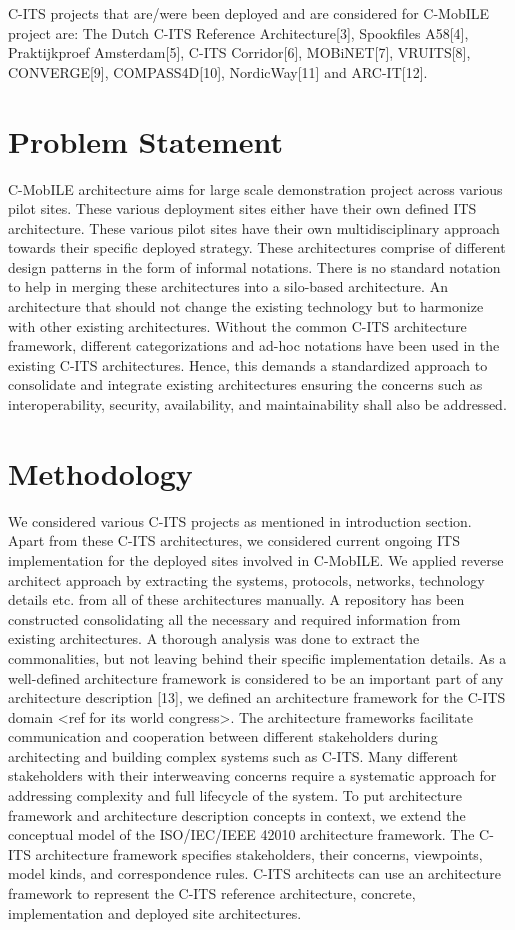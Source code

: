 \documentclass[conference]{IEEEtran}
\begin{document}
C-ITS projects that are/were been deployed and are considered for C-MobILE project are: The Dutch C-ITS Reference Architecture[3], Spookfiles A58[4], Praktijkproef Amsterdam[5], C-ITS Corridor[6], MOBiNET[7], VRUITS[8], CONVERGE[9], COMPASS4D[10], NordicWay[11] and ARC-IT[12].

\section{Problem Statement}

C-MobILE architecture aims for large scale demonstration project across various pilot sites. These various deployment sites either have their own defined ITS architecture. These various pilot sites have their own multidisciplinary approach towards their specific deployed strategy. These architectures comprise of different design patterns in the form of informal notations. There is no standard notation to help in merging these architectures into a silo-based architecture. An architecture that should not change the existing technology but to harmonize with other existing architectures. Without the common C-ITS architecture framework, different categorizations and ad-hoc notations have been used in the existing C-ITS architectures. Hence, this demands a standardized approach to consolidate and integrate existing architectures ensuring the concerns such as interoperability, security, availability, and maintainability shall also be addressed. 

\section{Methodology}

We considered various C-ITS projects as mentioned in introduction section. Apart from these C-ITS architectures, we considered current ongoing ITS implementation for the deployed sites involved in C-MobILE. We applied reverse architect approach by extracting the systems, protocols, networks, technology details etc. from all of these architectures manually.  A repository has been constructed consolidating all the necessary and required information from existing architectures. A thorough analysis was done to extract the commonalities, but not leaving behind their specific implementation details. As a well-defined architecture framework is considered to be an important part of any architecture description [13], we defined an architecture framework for the C-ITS domain <ref for its world congress>. The architecture frameworks facilitate communication and cooperation between different stakeholders during architecting and building complex systems such as C-ITS. Many different stakeholders with their interweaving concerns require a systematic approach for addressing complexity and full lifecycle of the system. To put architecture framework and architecture description concepts in context, we extend the conceptual model of the ISO/IEC/IEEE 42010 architecture framework. The C-ITS architecture framework specifies stakeholders, their concerns, viewpoints, model kinds, and correspondence rules. C-ITS architects can use an architecture framework to represent the C-ITS reference architecture, concrete, implementation and deployed site architectures.
\end{document}
